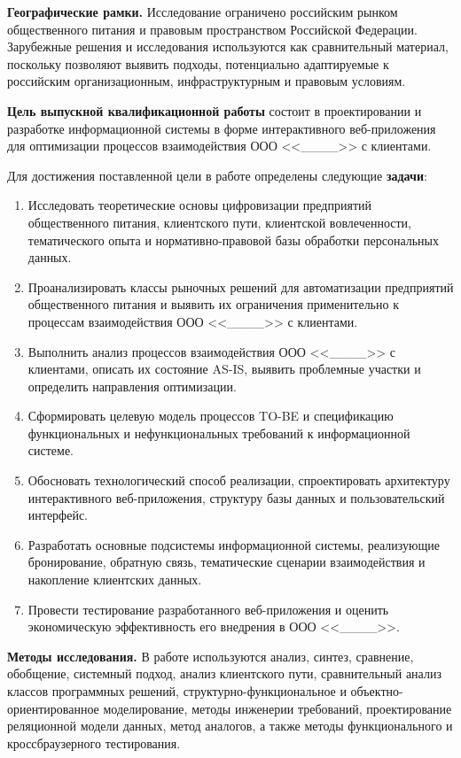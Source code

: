 \textbf{Географические рамки.} Исследование ограничено российским рынком общественного питания и правовым пространством Российской Федерации. Зарубежные решения и исследования используются как сравнительный материал, поскольку позволяют выявить подходы, потенциально адаптируемые к российским организационным, инфраструктурным и правовым условиям.

\textbf{Цель выпускной квалификационной работы} состоит в проектировании и разработке информационной системы в форме интерактивного веб-приложения для оптимизации процессов взаимодействия ООО <<\_\_\_\_>> с клиентами.

Для достижения поставленной цели в работе определены следующие \textbf{задачи}:
\begin{enumerate}
    \item Исследовать теоретические основы цифровизации предприятий общественного питания, клиентского пути, клиентской вовлеченности, тематического опыта и нормативно-правовой базы обработки персональных данных.
    \item Проанализировать классы рыночных решений для автоматизации предприятий общественного питания и выявить их ограничения применительно к процессам взаимодействия ООО <<\_\_\_\_>> с клиентами.
    \item Выполнить анализ процессов взаимодействия ООО <<\_\_\_\_>> с клиентами, описать их состояние AS-IS, выявить проблемные участки и определить направления оптимизации.
    \item Сформировать целевую модель процессов TO-BE и спецификацию функциональных и нефункциональных требований к информационной системе.
    \item Обосновать технологический способ реализации, спроектировать архитектуру интерактивного веб-приложения, структуру базы данных и пользовательский интерфейс.
    \item Разработать основные подсистемы информационной системы, реализующие бронирование, обратную связь, тематические сценарии взаимодействия и накопление клиентских данных.
    \item Провести тестирование разработанного веб-приложения и оценить экономическую эффективность его внедрения в ООО <<\_\_\_\_>>.
\end{enumerate}

\textbf{Методы исследования.} В работе используются анализ, синтез, сравнение, обобщение, системный подход, анализ клиентского пути, сравнительный анализ классов программных решений, структурно-функциональное и объектно-ориентированное моделирование, методы инженерии требований, проектирование реляционной модели данных, метод аналогов, а также методы функционального и кроссбраузерного тестирования.

